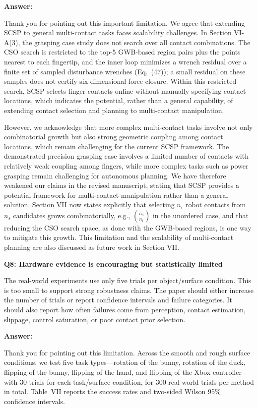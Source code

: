 \documentclass[journal,10pt]{IEEEtran}
\newcommand{\question}[2]{\par\smallskip\noindent
 \color{responseblue}\textbf{Q#1: #2}\par\nobreak\noindent\color{responseblue}}
\newcommand{\answer}{\par\smallskip\noindent\color{black}\textbf{Answer: }\ignorespaces
}
\begin{document}
\answer
Thank you for pointing out this important limitation. We agree that extending SCSP to general multi-contact tasks faces scalability challenges. In Section VI-A(3), the grasping case study does not search over all contact combinations. The CSO search is restricted to the top-5 GWB-based region pairs plus the points nearest to each fingertip, and the inner loop minimizes a wrench residual over a finite set of sampled disturbance wrenches (Eq.~(47)); a small residual on these samples does not certify six-dimensional force closure. Within this restricted search, SCSP selects finger contacts online without manually specifying contact locations, which indicates the potential, rather than a general capability, of extending contact selection and planning to multi-contact manipulation.

However, we acknowledge that more complex multi-contact tasks involve not only combinatorial growth but also strong geometric coupling among contact locations, which remain challenging for the current SCSP framework. The demonstrated precision grasping case involves a limited number of contacts with relatively weak coupling among fingers, while more complex tasks such as power grasping remain challenging for autonomous planning. We have therefore weakened our claims in the revised manuscript, stating that SCSP provides a potential framework for multi-contact manipulation rather than a general solution. Section VII now states explicitly that selecting $n_{\mathrm{r}}$ robot contacts from $n_s$ candidates grows combinatorially, e.g., $\binom{n_s}{n_{\mathrm{r}}}$ in the unordered case, and that reducing the CSO search space, as done with the GWB-based regions, is one way to mitigate this growth. This limitation and the scalability of multi-contact planning are also discussed as future work in Section VII.

\question{8}{Hardware evidence is encouraging but statistically limited}

The real-world experiments use only five trials per object/surface condition. This is too small to support strong robustness claims. The paper should either increase the number of trials or report confidence intervals and failure categories. It should also report how often failures come from perception, contact estimation, slippage, control saturation, or poor contact prior selection.

\answer
Thank you for pointing out this limitation.
Across the smooth and rough surface conditions, we test five task types---rotation of the bunny, rotation of the duck, flipping of the bunny, flipping of the hand, and flipping of the Xbox controller---with 30 trials for each task/surface condition, for 300 real-world trials per method in total. Table~VII reports the success rates and two-sided Wilson 95\% confidence intervals.
\end{document}
